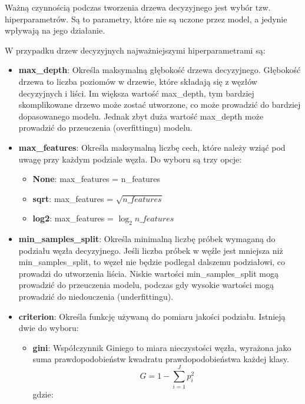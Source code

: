 \documentclass{article}
\begin{document}
Ważną czynnością podczas tworzenia drzewa decyzyjnego jest
wybór tzw. hiperparametrów. Są to parametry, które nie są
uczone przez model, a jedynie wpływają na jego działanie.

W przypadku drzew decyzyjnych najważniejszymi hiperparametrami
są:
\begin{itemize}
    \item \textbf{max\_depth}: Określa maksymalną 
    głębokość drzewa decyzyjnego. 
    Głębokość drzewa to liczba poziomów w 
    drzewie, które składają się z węzłów 
    decyzyjnych i liści. Im większa wartość 
    max\_depth, tym bardziej skomplikowane 
    drzewo może zostać utworzone, co może 
    prowadzić do bardziej dopasowanego modelu. 
    Jednak zbyt duża wartość max\_depth może 
    prowadzić do przeuczenia (overfittingu) modelu.
    \item \textbf{max\_features}: Określa maksymalną
    liczbę cech, które należy wziąć pod uwagę
    przy każdym podziale węzła. Do wyboru są trzy opcje:
    \begin{itemize}
        \item \textbf{None}: max\_features = n\_features
        \item \textbf{sqrt}: max\_features = $\sqrt{n\_features}$
        \item \textbf{log2}: max\_features = $\log_2{n\_features}$
    \end{itemize}
    \item \textbf{min\_samples\_split}: Określa minimalną 
    liczbę próbek wymaganą do podziału węzła decyzyjnego. 
    Jeśli liczba próbek w węźle jest mniejsza niż 
    min\_samples\_split, to węzeł nie będzie podlegał 
    dalszemu podziałowi, co prowadzi do utworzenia 
    liścia. Niskie wartości min\_samples\_split mogą 
    prowadzić do przeuczenia modelu, podczas gdy 
    wysokie wartości mogą prowadzić do niedouczenia (underfittingu).
    \item \textbf{criterion}: Określa funkcję używaną 
    do pomiaru jakości podziału. Istnieją dwie do wyboru:
    \begin{itemize}
        \item \textbf{gini}: Współczynnik Giniego to miara
        nieczystości węzła, wyrażona jako suma prawdopodobieństw
        kwadratu prawdopodobieństwa każdej klasy.
        \begin{equation}
            G = 1 - \sum_{i=1}^{J}p_i^2
        \end{equation}
        gdzie: 
        \begin{itemize}

\end{itemize}
\end{itemize}
\end{itemize}
\end{document}
